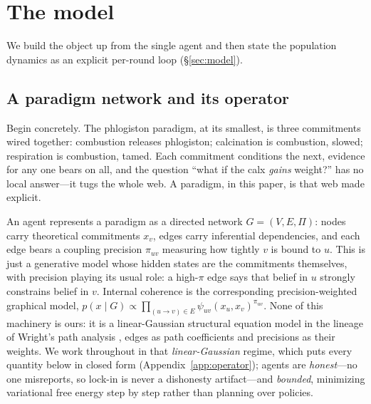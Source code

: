\documentclass[runningheads]{llncs}
\begin{document}
\section{The model}
\label{sec:bmebmr}

We build the object up from the single agent and then state the population dynamics as an explicit
per-round loop (\S\ref{sec:model}).

\subsection{A paradigm network and its operator}
\label{sec:carryover}

Begin concretely. The phlogiston paradigm, at its smallest, is three commitments wired together:
combustion releases phlogiston; calcination is combustion, slowed; respiration is combustion,
tamed. Each commitment conditions the next, evidence for any one bears on all, and the question
``what if the calx \emph{gains} weight?'' has no local answer---it tugs the whole web. A
paradigm, in this paper, is that web made explicit.

An agent represents a paradigm as a directed network $G=(V,E,\Pi)$: nodes carry theoretical
commitments $x_v$, edges carry inferential dependencies, and each edge bears a coupling precision
$\pi_{uv}$ measuring how tightly $v$ is bound to $u$. This is just a generative model whose hidden
states are the commitments themselves, with precision playing its usual role: a high-$\pi$ edge says
that belief in $u$ strongly constrains belief in $v$. Internal coherence is the corresponding
precision-weighted graphical model, $p(x\mid G)\propto\prod_{(u\to v)\in
E}\psi_{uv}(x_u,x_v)^{\pi_{uv}}$. None of this machinery is ours: it is a linear-Gaussian structural
equation model in the lineage of Wright's path analysis \citep{wright1934}, edges as path
coefficients and precisions as their weights. We work
throughout in that \emph{linear-Gaussian} regime, which puts every quantity below in closed form
(Appendix~\ref{app:operator}); agents are \emph{honest}---no one misreports, so lock-in is never a
dishonesty artifact---and \emph{bounded}, minimizing variational free energy step by step
\citep{dacosta2020} rather than planning over policies.
\end{document}
